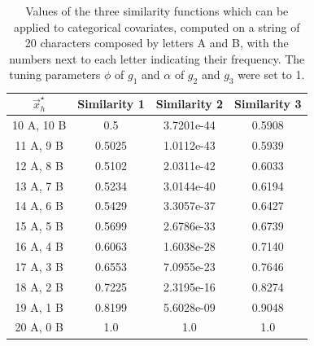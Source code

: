 \documentclass[12pt,	%
	a4paper,		%
	twoside,		%
	openright,		%
	titlepage,%
	]{book}
\theoremstyle{definition}
\begin{document}
\begin{table}[!ht]
    \centering
    \caption[Analysis of similarity functions, categorical covariates]{Values of the three similarity functions which can be applied to categorical covariates, computed on a string of 20 characters composed by letters A and B, with the numbers next to each letter indicating their frequency. The tuning parameters $\phi$ of $g_1$ and $\alpha$ of $g_2$ and $g_3$ were set to 1.}
    \label{tab: sim cat test}
    \begin{tabular}{cccc}
        \toprule
        $\vec{x}^\star_h$ & Similarity 1 & Similarity 2 & Similarity 3 \\
        \midrule
10 A, 10 B & 0.5 & 3.7201e-44 & 0.5908\\
11 A, 9 B  & 0.5025 & 1.0112e-43 & 0.5939\\
12 A, 8 B  & 0.5102 & 2.0311e-42 & 0.6033\\
13 A, 7 B  & 0.5234 & 3.0144e-40 & 0.6194\\
14 A, 6 B  & 0.5429 & 3.3057e-37 & 0.6427\\
15 A, 5 B  & 0.5699 & 2.6786e-33 & 0.6739\\
16 A, 4 B  & 0.6063 & 1.6038e-28 & 0.7140\\
17 A, 3 B  & 0.6553 & 7.0955e-23 & 0.7646\\
18 A, 2 B  & 0.7225 & 2.3195e-16 & 0.8274\\
19 A, 1 B  & 0.8199 & 5.6028e-09 & 0.9048\\
20 A, 0 B  & 1.0 & 1.0 & 1.0\\
        \bottomrule
    \end{tabular}
\end{table}
\end{document}
